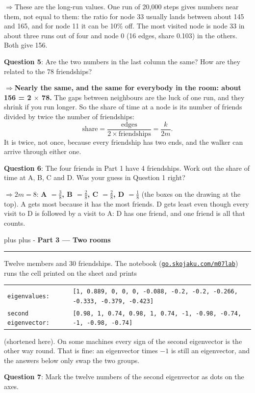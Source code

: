 \documentclass[a4paper, 14pt]{extarticle}
\newcommand{\needroom}[1]{%
  \par
  \begingroup
    \setlength{\dimen0}{#1}%
    \vskip 0pt plus \dimen0
    \penalty -100%
    \vskip 0pt plus -\dimen0
  \endgroup}
\newcommand{\parthead}[2]{%
  \needroom{6\baselineskip}%
  \partheadhere{#1}{#2}}
\newcommand{\partheadhere}[2]{%
  \vspace{0.5em}
  {\large\bfseries Part #1 --- #2}\par
  \vspace{-0.4em}\rule{\textwidth}{0.8pt}\par
  \vspace{0.1em}}
\newcommand{\molablink}{https://go.skojaku.com/m07lab}
\newcommand{\molaburl}{\href{\molablink}{\texttt{go.skojaku.com/m07lab}}}
\newcommand{\ans}[1]{\textbf{\textcolor{pltblue!75!black}{#1}}}
\newcommand{\arrow}{\textcolor{pltblue!75!black}{$\Rightarrow$}\;}
\begin{document}
\arrow These are the long-run values. One run of 20,000 steps gives numbers
near them, not equal to them: the ratio for node 33 usually lands between
about 145 and 165, and for node 11 it can be 10\% off. The most visited node
is node 33 in about three runs out of four and node 0 (16 edges, share 0.103)
in the others. Both give 156.

{\bf Question 5}: Are the two numbers in the last column the same? How are
they related to the 78 friendships?

\arrow \ans{Nearly the same, and the same for everybody in the room: about 156 =
2 $\times$ 78.} The gaps between neighbours are the luck of one run, and they
shrink if you run longer. So the share of time at a node is its number of
friends divided by twice the number of friendships:
\[
\text{share} = \frac{\text{edges}}{2 \times \text{friendships}} = \frac{k}{2m}.
\]
It is twice, not once, because every friendship has two ends, and the walker
can arrive through either one.

{\bf Question 6}: The four friends in Part 1 have 4 friendships. Work out the
share of time at A, B, C and D. Was your guess in Question 1 right?

\arrow $2m = 8$: \ans{A $= \frac38$, B $= \frac28$, C $= \frac28$, D $=
\frac18$} (the boxes on the drawing at the top). A gets most because it has the
most friends. D gets least even though every visit to D is followed by a visit
to A: D has one friend, and one friend is all that counts.

\parthead{3}{Two rooms}

Twelve members and 30 friendships. The notebook (\molaburl) runs the cell
printed on the sheet and prints
\begin{center}
{\small\begin{tabular}{@{}l@{\;}l@{}}
\texttt{eigenvalues:} & \texttt{[1, 0.889, 0, 0, 0, -0.088, -0.2, -0.2, -0.266, -0.333, -0.379, -0.423]}\\
\texttt{second eigenvector:} & \texttt{[0.98, 1, 0.74, 0.98, 1, 0.74, -1, -0.98, -0.74, -1, -0.98, -0.74]}
\end{tabular}}
\end{center}
(shortened here). On some machines every sign of the second eigenvector is the
other way round. That is fine: an eigenvector times $-1$ is still an
eigenvector, and the answers below only swap the two groups.

{\bf Question 7}: Mark the twelve numbers of the second eigenvector as dots on
the axes.
\end{document}
